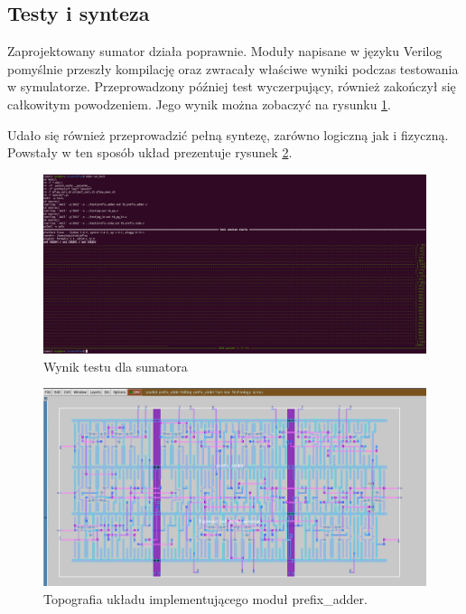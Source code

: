 \documentclass[12pt,oneside,reqno]{article}
\begin{document}
\subsection{Testy i synteza}
Zaprojektowany sumator działa poprawnie. Moduły napisane w języku Verilog pomyślnie przeszły kompilację oraz zwracały właściwe wyniki podczas testowania w symulatorze. Przeprowadzony później test wyczerpujący, również zakończył się całkowitym powodzeniem. Jego wynik można zobaczyć na rysunku \ref{fig:pytest_all}.

Udało się również przeprowadzić pełną syntezę, zarówno logiczną jak i fizyczną. Powstały w ten sposób układ prezentuje rysunek \ref{fig:layout-prefix-adder}.

\begin{figure}[H]
\centering
\includegraphics[width=\linewidth]{images/pytest_all.png}
\caption{Wynik testu dla sumatora}
\label{fig:pytest_all}
\end{figure}

\begin{figure}[H]
\centering
\includegraphics[width=\linewidth]{images/hardware_layout.png}
\caption{Topografia układu implementującego moduł prefix\_adder.}
\label{fig:layout-prefix-adder}
\end{figure}
\end{document}
